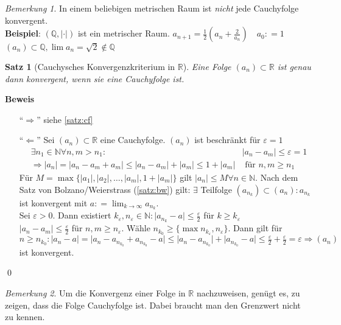 \documentclass[ngerman,titlepage,twoside, parskip=half*]{scrreprt}
\newcommand*{\N}{\mathbb{N}}
\newcommand*{\Q}{\mathbb{Q}}
\newcommand*{\R}{\mathbb{R}}
\theoremstyle{plain}
\newtheorem{theorem}{Satz}[section]
\theoremstyle{definition}
\theoremstyle{remark}
\newtheorem*{remark}{Bemerkung}
\newcommand*{\abs}[2][]{#1\lvert#2#1\rvert}
\newcommand*{\coloneqq}{\mathrel{\mathop:}=}
\begin{document}
\begin{remark}
In einem beliebigen metrischen Raum ist \emph{nicht} jede Cauchyfolge konvergent.\\
\textbf{Beispiel}: $(\Q,\abs{\cdot })$ ist ein metrischer Raum. $a_{n+1}=\frac{1}{2}(a_n+\frac{2}{a_n})\quad a_0\coloneqq1$\\
$(a_n)\subset \Q, \lim a_n =\sqrt{2}\notin \Q$
\end{remark}

\begin{theorem}[Cauchysches Konvergenzkriterium in $\R$]
\label{satz:CKonv}
 Eine Folge $(a_n)\subset \R$ 
ist genau dann konvergent, wenn sie eine Cauchyfolge ist.
\end{theorem}
\textbf{Beweis}
\begin{itemize}
  \item["`$\Rightarrow$"'] siehe \autoref{satz:cf}
  \item["`$\Leftarrow$"'] Sei $(a_n)\subset \R$ eine
    Cauchyfolge. $(a_n)$ ist beschränkt für $\varepsilon=1$
    \begin{align*}
      & \exists n_1\in \N \forall n,m >n_1 \colon&\abs{a_n-a_m}\leq\varepsilon =1\\  
      &\Rightarrow \abs{a_n}=\abs{a_n-a_m+a_m}\leq \abs{a_n-a_m}+\abs{a_m}\leq 1+\abs{a_m}
      & \text{ für } n,m\geq n_1
    \end{align*}
    Für $M=\max\{\abs{a_1},\abs{a_2},\ldots, \abs{a_m}, 1+\abs{a_m}\}$ gilt $\abs{a_n}\leq
    M \forall n \in \N$. Nach dem Satz von Bolzano/Weierstrass
    (\autoref{satz:bw}) gilt: $\exists$ Teilfolge $(a_{n_k})\subset
    (a_n)\colon a_{n_k}$ ist konvergent mit $a\coloneqq\lim_{k\rightarrow \infty}
    a_{n_k}$.\\
    Sei $\varepsilon>0$. Dann existiert $k_{\varepsilon}, n_{\varepsilon} \in \N \colon\abs{a_{n_k}-a}\leq \frac{\varepsilon}{2}$
    für $k\geq k_{\varepsilon}$\\
    $\abs{a_n-a_m}\leq \frac{\varepsilon}{2}$ für $n,m \geq n_{\varepsilon}$. Wähle $n_{k_0}\geq \{\max n_{k_{\varepsilon}},
    n_{\varepsilon}\}$. Dann gilt für $n\geq n_{k_0}\colon\abs{a_n-a}=\abs{a_n-a_{n_{k_0}}+a_{n_{k_0}}-a}\leq 
    \abs{a_n-a_{n_{k_0}}}+\abs{a_{n_{k_0}}-a}\leq \frac{\varepsilon}{2}+\frac{\varepsilon}{2}=\varepsilon \Rightarrow (a_n)$
    ist konvergent.
\end{itemize}
\qed

\begin{remark}
Um die Konvergenz einer Folge in $\R$ nachzuweisen, genügt es, zu zeigen, dass die Folge Cauchyfolge ist. Dabei braucht 
man den Grenzwert nicht zu kennen.
\end{remark}
\end{document}
